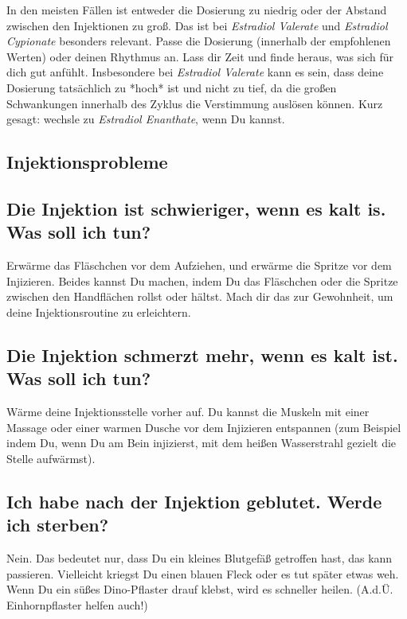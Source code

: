 \documentclass{article}
\begin{document}
{{In den meisten Fällen ist entweder die Dosierung zu niedrig oder der Abstand zwischen den Injektionen zu groß. Das ist bei \textit{Estradiol Valerate} und \textit{Estradiol Cypionate} besonders relevant. Passe die Dosierung (innerhalb der empfohlenen Werten) oder deinen Rhythmus an. Lass dir Zeit und finde heraus, was sich für dich gut anfühlt. Insbesondere bei \textit{Estradiol Valerate} kann es sein, dass deine Dosierung tatsächlich zu *hoch* ist und nicht zu tief, da die großen Schwankungen innerhalb des Zyklus die Verstimmung auslösen können. Kurz gesagt: wechsle zu \textit{Estradiol Enanthate}, wenn Du kannst.

\subsection*{Injektionsprobleme}

\subsection{Die Injektion ist schwieriger, wenn es kalt is. Was soll ich tun?}

Erwärme das Fläschchen vor dem Aufziehen, und erwärme die Spritze vor dem Injizieren. Beides kannst Du machen, indem Du das Fläschchen oder die Spritze zwischen den Handflächen rollst oder hältst. Mach dir das zur Gewohnheit, um deine Injektionsroutine zu erleichtern.

\subsection{Die Injektion schmerzt mehr, wenn es kalt ist. Was soll ich tun?}

Wärme deine Injektionsstelle vorher auf. Du kannst die Muskeln mit einer Massage oder einer warmen Dusche vor dem Injizieren entspannen (zum Beispiel indem Du, wenn Du am Bein injizierst, mit dem heißen Wasserstrahl gezielt die Stelle aufwärmst).

\subsection{Ich habe nach der Injektion geblutet. Werde ich sterben?}

Nein. Das bedeutet nur, dass Du ein kleines Blutgefäß getroffen hast, das kann passieren. Vielleicht kriegst Du einen blauen Fleck oder es tut später etwas weh. Wenn Du ein süßes Dino-Pflaster drauf klebst, wird es schneller heilen. (A.d.Ü. Einhornpflaster helfen auch!)

}}
\end{document}
